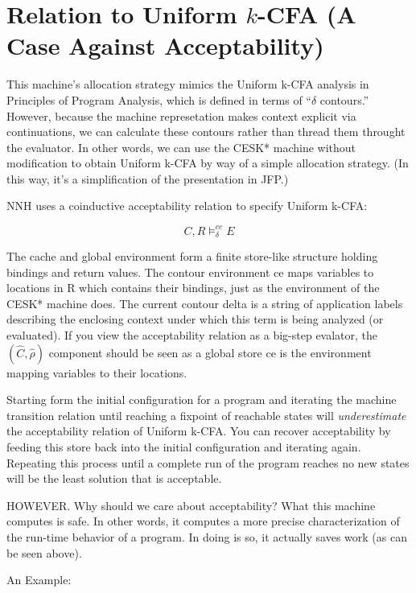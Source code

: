 \appendix
\section{Relation to Uniform \(k\)-CFA (A Case Against Acceptability)}
\label{sec:accept}

\cite{dvanhorn:nielson-nielson-popl97} \cite{dvanhorn:Neilson:1999}

This machine's allocation strategy mimics the Uniform k-CFA analysis
in Principles of Program Analysis, which is defined in terms of
``$\delta$ contours.''  However, because the machine represetation makes
context explicit via continuations, we can calculate these contours
rather than thread them throught the evaluator.  In other words, we
can use the CESK* machine without modification to obtain Uniform k-CFA
by way of a simple allocation strategy.  (In this way, it's a
simplification of the presentation in JFP.)

NNH uses a coinductive acceptability relation to specify Uniform
k-CFA:

\[
   C,R \models^{ce}_\delta E
\]

The cache and global environment form a finite store-like structure
holding bindings and return values.  The contour environment ce maps
variables to locations in R which contains their bindings, just as the
environment of the CESK* machine does.  The current contour delta is a
string of application labels describing the enclosing context under
which this term is being analyzed (or evaluated).  If you view the
acceptability relation as a big-step evalator, the
$(\widehat C,\widehat\rho)$ component should be seen as a global
store ce is the environment mapping variables to their locations.

Starting form the initial configuration for a program and iterating
the machine transition relation until reaching a fixpoint of reachable
states will \emph{underestimate} the acceptability relation of Uniform
k-CFA.  You can recover acceptability by feeding this store back into
the initial configuration and iterating again.  Repeating this process
until a complete run of the program reaches no new states will be the
least solution that is acceptable.

HOWEVER.  Why should we care about acceptability?  What this
machine computes is safe.  In other words, it computes a more
precise characterization of the run-time behavior of a program.  In
doing is so, it actually saves work (as can be seen above).

An Example:

